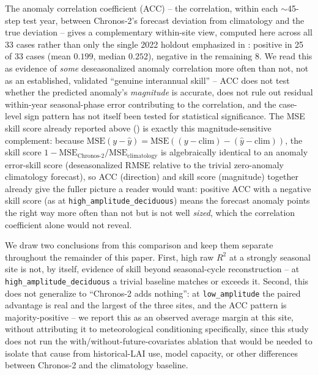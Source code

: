 \documentclass[11pt]{article}
\begin{document}
The anomaly correlation coefficient (ACC) -- the correlation, within each $\sim$45-step test year,
between Chronos-2's forecast deviation from climatology and the true deviation -- gives a
complementary within-site view, computed here across all 33 cases rather than only the single 2022
holdout emphasized in : positive in 25 of 33 cases (mean $0.199$, median
$0.252$), negative in the remaining 8. We read this as evidence of \emph{some} deseasonalized
anomaly correlation more often than not, not as an established, validated ``genuine interannual
skill'' -- ACC does not test whether the predicted anomaly's \emph{magnitude} is accurate, does not
rule out residual within-year seasonal-phase error contributing to the correlation, and the
case-level sign pattern has not itself been tested for statistical significance. The MSE skill
score already reported above () is exactly this magnitude-sensitive
complement: because $\mathrm{MSE}(y - \hat{y}) = \mathrm{MSE}((y-\mathrm{clim}) -
(\hat{y}-\mathrm{clim}))$, the skill score $1 - \mathrm{MSE}_{\text{Chronos-2}}/
\mathrm{MSE}_{\text{climatology}}$ is algebraically identical to an anomaly error-skill score
(deseasonalized RMSE relative to the trivial zero-anomaly climatology forecast), so ACC (direction)
and skill score (magnitude) together already give the fuller picture a reader would want: positive
ACC with a negative skill score (as at \texttt{high\_amplitude\_deciduous}) means the forecast
anomaly points the right way more often than not but is not well \emph{sized}, which the
correlation coefficient alone would not reveal.

We draw two conclusions from this comparison and keep them separate throughout the remainder of
this paper. First, high raw $R^2$ at a strongly seasonal site is not, by itself, evidence of skill
beyond seasonal-cycle reconstruction -- at \texttt{high\_amplitude\_deciduous} a trivial baseline
matches or exceeds it. Second, this does not generalize to ``Chronos-2 adds nothing'': at
\texttt{low\_amplitude} the paired advantage is real and the largest of the three sites, and the
ACC pattern is majority-positive -- we report this as an observed average margin at this site,
without attributing it to meteorological conditioning specifically, since this study does not run
the with/without-future-covariates ablation that would be needed to isolate that cause from
historical-LAI use, model capacity, or other differences between Chronos-2 and the climatology
baseline.


\end{document}

